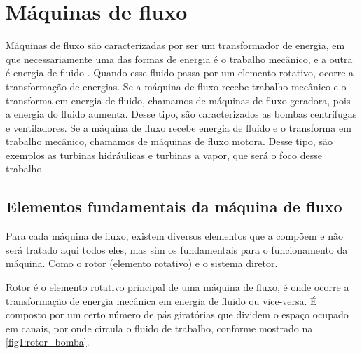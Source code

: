 

\section{Máquinas de fluxo}

	Máquinas de fluxo são caracterizadas por ser um transformador de energia, em que necessariamente uma das formas de energia é o trabalho mecânico, e a outra é energia de fluido \cite{maq_fluidos_henn}. Quando esse fluido passa por um elemento rotativo, ocorre a transformação de energias. Se a máquina de fluxo recebe trabalho mecânico e o transforma em energia de fluido, chamamos de máquinas de fluxo geradora, pois a energia do fluido aumenta. Desse tipo, são caracterizados as bombas centrífugas e ventiladores. Se a máquina de fluxo recebe energia de fluido e o transforma em trabalho mecânico, chamamos de máquinas de fluxo motora. Desse tipo, são exemplos as turbinas hidráulicas e turbinas a vapor, que será o foco desse trabalho.

\subsection{Elementos fundamentais da máquina de fluxo}

    Para cada máquina de fluxo, existem diversos elementos que a compõem e não será tratado aqui todos eles, mas sim os fundamentais para o funcionamento da máquina. Como o rotor (elemento rotativo) e o sistema diretor.

	Rotor é o elemento rotativo principal de uma máquina de fluxo, é onde ocorre a transformação de energia mecânica em energia de fluido ou vice-versa. É composto por um certo número de pás giratórias que dividem o espaço ocupado em canais, por onde circula o fluido de trabalho, conforme mostrado na \autoref{fig1:rotor_bomba}.

